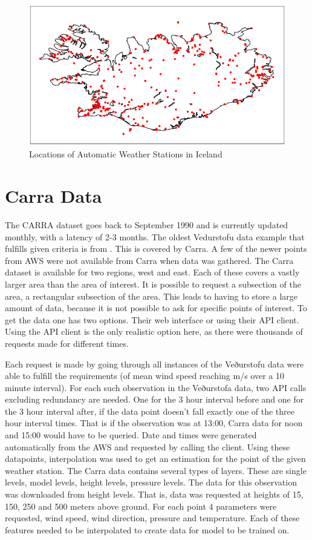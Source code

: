 \begin{figure}[h]
    \caption{Locations of Automatic Weather Stations in Iceland}
    \label{fig:aws_map}
    \includegraphics[scale = 0.75]{Figures/weather_stations.png}
\end{figure}

\section{Carra Data}
The CARRA dataset goes back to September 1990 and is currently updated monthly, with a latency of 2-3 months. The oldest Vedurstofu data example that fulfills given criteria is from \startDateVedur. This is covered by Carra. A few of the newer points from AWS were not available from Carra when data was gathered. The Carra dataset is available for two regions, west and east. Each of these covers a vastly larger area than the area of interest. It is possible to request a subsection of the area, a rectangular subsection of the area. This leads to having to store a large amount of data, because it is not possible to ask for specific points of interest. To get the data one has two options. Their web interface or using their API client. Using the API client is the only realistic option here, as there were thousands of requests made for different times.

Each request is made by going through all instances of the Veðurstofu data were able to fulfill the requirements (of mean wind speed reaching \averageWindSpeedLimit m/s over a 10 minute interval). For each such observation in the Veðurstofa data, two API calls excluding redundancy are needed. One for the 3 hour interval before and one for the 3 hour interval after, if the data point doesn't fall exactly one of the three hour interval times. That is if the observation was at 13:00, Carra data for noon and 15:00 would have to be queried. Date and times were generated automatically from the AWS and requested by calling the client. Using these datapoints, interpolation was used to get an estimation for the point of the given weather station. The Carra data contains several types of layers. These are single levels, model levels, height levels, pressure levels. The data for this observation was downloaded from height levels. That is, data was requested at heights of 15, 150, 250 and 500 meters above ground. For each point 4 parameters were requested, wind speed, wind direction, pressure and temperature. Each of these features needed to be interpolated to create data for model to be trained on.

